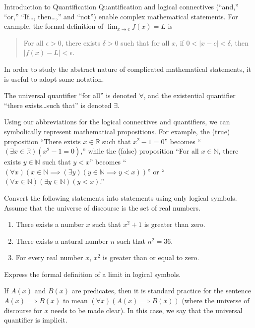 \begin{section}{Introduction to Quantification}
Quantification and logical connectives (``and,'' ``or,'' ``If\ldots, then\ldots,'' and ``not'') enable complex mathematical statements. For example, the formal definition of $\lim_{x\to c}f(x)=L$ is 
\begin{quote}
For all $\epsilon >0$, there exists $\delta >0$ such that for all $x$, if $0<|x-c|<\delta$, then $|f(x)-L|<\epsilon$.
\end{quote}

In order to study the abstract nature of complicated mathematical statements, it is useful to adopt some notation.

\begin{definition}
The universal quantifier ``for all'' is denoted $\boxed{\forall}$, and the existential quantifier  ``there exists\ldots such that'' is denoted $\boxed{\exists}$.
\end{definition}

Using our abbreviations for the logical connectives and quantifiers, we can symbolically represent mathematical propositions. For example, the (true) proposition ``There exists $x \in \mathbb{R}$ such that $x^2-1=0$'' becomes ``$(\exists x \in \mathbb{R})(x^2-1=0)$,'' while the (false) proposition ``For all $x\in \mathbb{N}$, there exists $y\in\mathbb{N}$ such that $y<x$'' becomes ``$(\forall x)(x\in\mathbb{N}\implies (\exists y)(y\in\mathbb{N}\implies y<x))$'' or ``$(\forall x\in\mathbb{N})(\exists y\in\mathbb{N})(y<x)$.''

\begin{exercise} Convert the following statements into statements using only logical symbols.  Assume that the universe of discourse is the set of real numbers.
\begin{enumerate}[label=\textrm{(\alph*)}]
\item There exists a number $x$ such that $x^2+1$ is greater than zero.
\item There exists a natural number $n$ such that $n^2=36$. 
\item For every real number $x$, $x^2$ is greater than or equal to zero.
\end{enumerate}
\end{exercise}

\begin{exercise}
Express the formal definition of a limit in logical symbols.
\end{exercise}

If $A(x)$ and $B(x)$ are predicates, then it is standard practice for the sentence $A(x)\implies B(x)$ to mean $(\forall x)(A(x)\implies B(x))$ (where the universe of discourse for $x$ needs to be made clear).  In this case, we say that the universal quantifier is implicit.


\end{section}
